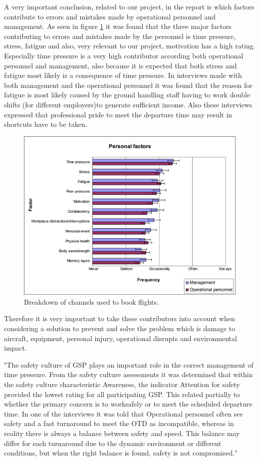 A very important conclusion, related to our project, in the report is which factors contribute to errors and mistakes made by operational personnel and management. As seen in figure \ref{PersonalFactors} it was found that the three major factors contributing to errors and mistakes made by the personnel is time pressure, stress, fatigue and also, very relevant to our project, motivation has a high rating. Especially time pressure is a very high contributor according both operational personnel and management, also because it is expected that both stress and fatigue most likely is a consequence of time pressure. In interviews made with both management and the operational personnel it was found that the reason for fatigue is most likely caused by the ground handling staff having to work double shifts (for different employers)to generate sufficient income. Also these interviews expressed that professional pride to meet the departure time may result in shortcuts have to be taken.

\begin{figure}
\centering
\includegraphics[width=\textwidth]{Grafik/PersonalFactors}
\caption{Breakdown of channels used to book flights.}
\label{PersonalFactors}
\end{figure}

Therefore it is very important to take these contributors into account when considering a solution to prevent and solve the problem which is damage to aircraft, equipment, personal injury, operational disrupts and environmental impact.

"The safety culture of GSP plays an important role in the correct management of time pressure. From the safety culture assessments it was determined that within the safety culture characteristic Awareness, the indicator Attention for safety provided the lowest rating for all participating GSP. This related partially to whether the primary concern is to worksafely or to meet the scheduled departure time. In one of the interviews it was told that Operational personnel often see safety and a fast turnaround to meet the OTD as incompatible, whereas in reality there is always a balance between safety and speed. This balance may differ for each turnaround due to the dynamic environment or different conditions, but when the right balance is found, safety is not compromised."

